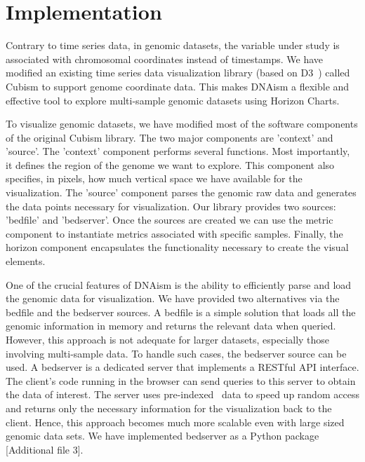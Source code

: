 \documentclass[twocolumn]{bmcart}
\begin{document}
\section*{Implementation}

Contrary to time series data, in genomic datasets, the variable under study is
associated with chromosomal coordinates instead of timestamps. We have modified
an existing time series data visualization library (based on D3~\cite{2011-d3})
called Cubism to support genome coordinate data. This makes DNAism a flexible
and effective tool to explore multi-sample genomic datasets using Horizon
Charts.

To visualize genomic datasets, we have modified most of the software components
of the original Cubism library.  The two major components are 'context' and
'source'.  The 'context' component performs several functions. Most
importantly, it defines the region of the genome we want to explore. This
component also specifies, in pixels, how much vertical space we have available
for the visualization.  The 'source' component parses the genomic raw data and
generates the data points necessary for visualization. Our library provides two
sources: 'bedfile' and 'bedserver'. Once the sources are created we can use the
metric component to instantiate metrics associated with specific samples.
Finally, the horizon component encapsulates the functionality necessary to
create the visual elements.

One of the crucial features of DNAism is the ability to efficiently parse and
load the genomic data for visualization. We have provided two alternatives via
the bedfile and the bedserver sources. A bedfile is a simple solution that
loads all the genomic information  in memory and returns the relevant data when
queried.  However, this approach is not adequate for larger datasets,
especially those involving multi-sample data. To handle such cases, the
bedserver source can be used. A bedserver is a dedicated server that implements
a RESTful API interface. The client's code running in the browser can send
queries to this server to obtain the data of interest.  The server uses
pre-indexed~\cite{tabix-li} data to speed up random access and returns only the
necessary information for the visualization back to the client.  Hence, this
approach becomes much more scalable even with large sized genomic data sets. We
have implemented bedserver as a Python package [Additional file 3].
\end{document}
